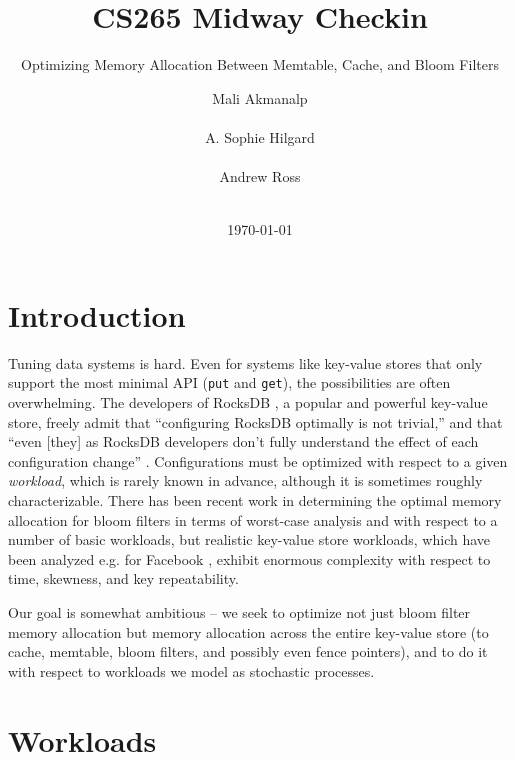 \documentclass{sig-alternate-05-2015}
\begin{document}
\title{CS265 Midway Checkin}
\subtitle{Optimizing Memory Allocation Between Memtable, Cache, and Bloom Filters}
\author{
\alignauthor
Mali Akmanalp\\
       \\
\alignauthor
A. Sophie Hilgard\\
       \\
\alignauthor Andrew Ross\\
       \\
       }

\date{\today}

\maketitle

\section{Introduction}
Tuning data systems is hard. Even for systems like key-value stores that only
support the most minimal API (\texttt{put} and \texttt{get}), the possibilities
are often overwhelming. The developers of RocksDB \cite{facebook:rocksdb}, a
popular and powerful key-value store, freely admit that ``configuring RocksDB
optimally is not trivial,'' and that ``even [they] as RocksDB developers don't
fully understand the effect of each configuration change''
\cite{rocksdb-tuning-guide}. Configurations must be optimized with respect to a
given \textit{workload}, which is rarely known in advance, although it is
sometimes roughly characterizable. There has been recent work \cite{monkey} in
determining the optimal memory allocation for bloom filters in terms of
worst-case analysis and with respect to a number of basic workloads, but
realistic key-value store workloads, which have been analyzed e.g. for Facebook
\cite{characterizing-memcached}, exhibit enormous complexity with respect to
time, skewness, and key repeatability.

Our goal is somewhat ambitious -- we seek to optimize not just bloom filter
memory allocation but memory allocation across the entire key-value store (to
cache, memtable, bloom filters, and possibly even fence pointers), and to do it
with respect to workloads we model as stochastic processes.

\section{Workloads}
\end{document}
